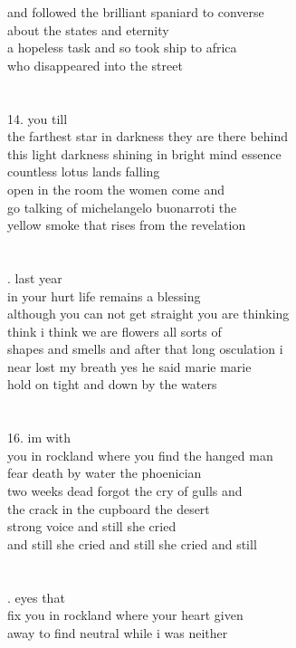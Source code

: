 \documentclass{article}
\begin{document}
and followed the brilliant spaniard to converse\\
about the states and eternity\\
a hopeless task and so took ship to africa\\
who disappeared into the street\\
\\
\\
14. you till\\
the farthest star in darkness they are there behind\\
this light darkness shining in bright mind essence\\
countless lotus lands falling\\
open in the room the women come and\\
go talking of michelangelo buonarroti the\\
yellow smoke that rises from the revelation\\
\\
\\
\newpage
{}. last year\\
in your hurt life remains a blessing\\
although you can not get straight you are thinking\\
think i think we are flowers all sorts of\\
shapes and smells and after that long osculation i\\
near lost my breath yes he said marie marie\\
hold on tight and down by the waters\\
\\
\\
16. im with\\
you in rockland where you find the hanged man\\
fear death by water the phoenician\\
two weeks dead forgot the cry of gulls and\\
the crack in the cupboard the desert\\
strong voice and still she cried\\
and still she cried and still she cried and still\\
\\
\\
\newpage
{}. eyes that\\
fix you in rockland where your heart given\\
away to find neutral while i was neither\\
\end{document}
